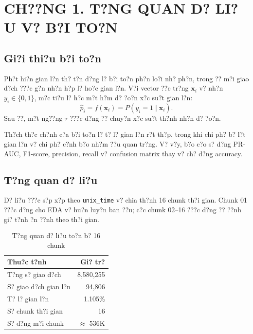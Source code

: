 \cleardoublepage
\section*{CH??NG 1. T?NG QUAN D? LI?U V? B?I TO?N}
\setcounter{section}{1}
\setcounter{subsection}{0}
\setcounter{figure}{0}
\setcounter{table}{0}

\subsection{Gi?i thi?u b?i to?n}

Ph?t hi?n gian l?n th? t?n d?ng l? b?i to?n ph?n lo?i nh? ph?n, trong ?? m?i giao d?ch ???c g?n nh?n h?p l? ho?c gian l?n. V?i vector ??c tr?ng $\mathbf{x}_i$ v? nh?n $y_i \in \{0,1\}$, m?c ti?u l? h?c m?t h?m d? ?o?n x?c su?t gian l?n:
\begin{equation}
    \hat{p}_i = f(\mathbf{x}_i) = P(y_i = 1 \mid \mathbf{x}_i).
\end{equation}
Sau ??, m?t ng??ng $\tau$ ???c d?ng ?? chuy?n x?c su?t th?nh nh?n d? ?o?n.

Th?ch th?c ch?nh c?a b?i to?n l? t? l? gian l?n r?t th?p, trong khi chi ph? b? l?t gian l?n v? chi ph? c?nh b?o nh?m ??u quan tr?ng. V? v?y, b?o c?o s? d?ng PR-AUC, F1-score, precision, recall v? confusion matrix thay v? ch? d?ng accuracy.

\subsection{T?ng quan d? li?u}

D? li?u ???c s?p x?p theo \texttt{unix\_time} v? chia th?nh 16 chunk th?i gian. Chunk 01 ???c d?ng cho EDA v? hu?n luy?n ban ??u; c?c chunk 02--16 ???c d?ng ?? ??nh gi? t?nh ?n ??nh theo th?i gian.

\begin{table}[H]
\centering
\caption{T?ng quan d? li?u to?n b? 16 chunk}
\begin{tabular}{lr}
\toprule
\textbf{Thu?c t?nh} & \textbf{Gi? tr?} \\
\midrule
T?ng s? giao d?ch & 8,580,255 \\
S? giao d?ch gian l?n & 94,806 \\
T? l? gian l?n & 1.105\% \\
S? chunk th?i gian & 16 \\
S? d?ng m?i chunk & $\approx$ 536K \\
\bottomrule
\end{tabular}
\end{table}

